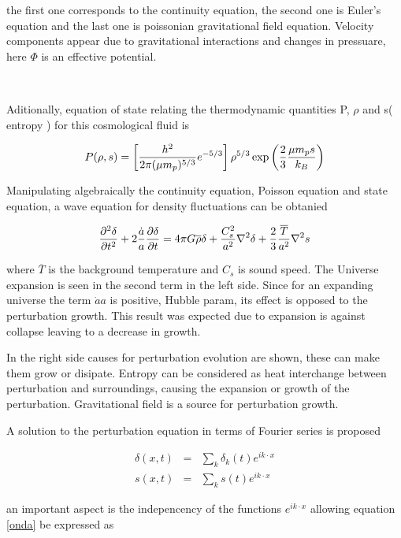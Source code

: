 the first one corresponds to the continuity equation, the second one is Euler's 
equation and the last one is poissonian gravitational field equation. Velocity 
components appear due to gravitational interactions and changes in pressuare,
here $\Phi$ is an effective potential. 

\

Aditionally, equation of state relating the thermodynamic quantities P, 
$\rho$ and s( entropy ) for this cosmological fluid is 

\begin{equation}
P(\rho,s)= \left[\frac{h^2}{2\pi(\mu m_p)^{5/3}}e^{-5/3}\right]\rho^{5/3}\exp \left(\frac{2}{3}\frac{\mu m_ps}{k_B}\right)
\label{ec.estado}
\end{equation}

Manipulating algebraically the continuity equation, Poisson equation and state equation,
a wave equation for density fluctuations can be obtanied

\begin{equation}
\frac{\partial^2\delta}{\partial t^2}+2\frac{\dot{a}}{a}\frac{\partial \delta}{\partial t} =
4\pi G \overline{\rho}\delta + \frac{C_s^2}{a^2}\nabla^2\delta+\frac{2}{3}\frac{\overline{T}}{a^2}\nabla^2s
\label{onda}
\end{equation}

where $\overline{T}$ is the background temperature and $C_s$ is sound speed.
The Universe expansion is seen in the second term in the left side. Since for an expanding
universe the term $\dot{a}{a}$ is positive, Hubble param, its effect is opposed to the perturbation 
growth. This result was expected due to expansion is against collapse leaving to
a decrease in growth. 	

In the right side causes for perturbation evolution are shown, these can make them grow 
or disipate. Entropy can be considered as heat interchange between perturbation and 
surroundings, causing the expansion or growth of the perturbation. Gravitational field
is a source for perturbation growth. 

A solution to the perturbation equation in terms of Fourier series is proposed

\begin{eqnarray}
\delta(x,t) &=& \sum_k \delta_k(t)e^{ik\cdot x} \nonumber\\
s(x,t) &=& \sum_k s(t)e^{ik\cdot x} \nonumber
\end{eqnarray}

an important aspect is the indepencency of the functions $e^{ik\cdot x}$ allowing 
equation \ref{onda} be expressed as 

